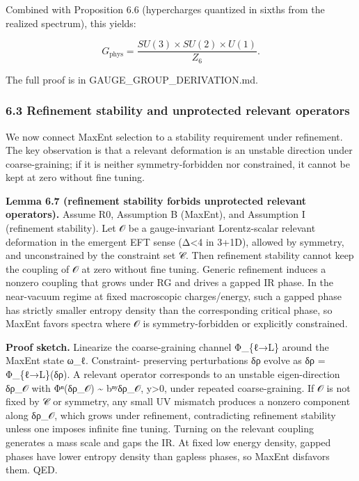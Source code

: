 Combined with Proposition 6.6 (hypercharges quantized in sixths from the realized spectrum), this yields:

\[
G_{\mathrm{phys}} = \frac{SU(3) \times SU(2) \times U(1)}{Z_6}.
\]

The full proof is in GAUGE\_GROUP\_DERIVATION.md.

\subsubsection{6.3 Refinement stability and unprotected relevant operators}\label{63-refinement-stability-and-unprotected-relevant-operators}

We now connect MaxEnt selection to a stability requirement under refinement. The key observation is that a relevant deformation is an unstable direction under coarse-graining; if it is neither symmetry-forbidden nor constrained, it cannot be kept at zero without fine tuning.

\textbf{Lemma 6.7 (refinement stability forbids unprotected relevant operators).} Assume R0, Assumption B (MaxEnt), and Assumption I (refinement stability). Let 𝒪 be a gauge-invariant Lorentz-scalar relevant deformation in the emergent EFT sense (Δ\textless4 in 3+1D), allowed by symmetry, and unconstrained by the constraint set 𝒞. Then refinement stability cannot keep the coupling of 𝒪 at zero without fine tuning. Generic refinement induces a nonzero coupling that grows under RG and drives a gapped IR phase. In the near-vacuum regime at fixed macroscopic charges/energy, such a gapped phase has strictly smaller entropy density than the corresponding critical phase, so MaxEnt favors spectra where 𝒪 is symmetry-forbidden or explicitly constrained.

\textbf{Proof sketch.} Linearize the coarse-graining channel Φ\_\{ℓ→L\} around the MaxEnt state ω\_ℓ. Constraint- preserving perturbations δρ evolve as δρ\textquotesingle{} = Φ\_\{ℓ→L\}(δρ). A relevant operator corresponds to an unstable eigen-direction δρ\_𝒪 with \textbar Φⁿ(δρ\_𝒪)\textbar{} \textasciitilde{} bⁿʸ\textbar δρ\_𝒪\textbar, y\textgreater0, under repeated coarse-graining. If 𝒪 is not fixed by 𝒞 or symmetry, any small UV mismatch produces a nonzero component along δρ\_𝒪, which grows under refinement, contradicting refinement stability unless one imposes infinite fine tuning. Turning on the relevant coupling generates a mass scale and gaps the IR. At fixed low energy density, gapped phases have lower entropy density than gapless phases, so MaxEnt disfavors them. QED.

